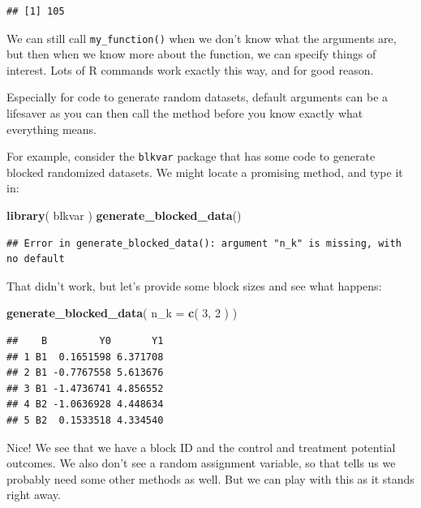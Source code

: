 \documentclass[
]{book}
\newenvironment{Shaded}{\begin{snugshade}}{\end{snugshade}}
\newcommand{\AttributeTok}[1]{\textcolor[rgb]{0.13,0.29,0.53}{#1}}
\newcommand{\DecValTok}[1]{\textcolor[rgb]{0.00,0.00,0.81}{#1}}
\newcommand{\FunctionTok}[1]{\textcolor[rgb]{0.13,0.29,0.53}{\textbf{#1}}}
\newcommand{\NormalTok}[1]{#1}
\begin{document}
\begin{verbatim}
## [1] 105
\end{verbatim}

We can still call \texttt{my\_function()} when we don't know what the arguments are, but then when we know more about the function, we can specify things of interest.
Lots of R commands work exactly this way, and for good reason.

Especially for code to generate random datasets, default arguments can be a lifesaver as you can then call the method before you know exactly what everything means.

For example, consider the \texttt{blkvar} package that has some code to generate blocked randomized datasets.
We might locate a promising method, and type it in:

\begin{Shaded}
\begin{Highlighting}[]
\FunctionTok{library}\NormalTok{( blkvar )}
\FunctionTok{generate\_blocked\_data}\NormalTok{()}
\end{Highlighting}
\end{Shaded}

\begin{verbatim}
## Error in generate_blocked_data(): argument "n_k" is missing, with no default
\end{verbatim}

That didn't work, but let's provide some block sizes and see what happens:

\begin{Shaded}
\begin{Highlighting}[]
\FunctionTok{generate\_blocked\_data}\NormalTok{( }\AttributeTok{n\_k =} \FunctionTok{c}\NormalTok{( }\DecValTok{3}\NormalTok{, }\DecValTok{2}\NormalTok{ ) )}
\end{Highlighting}
\end{Shaded}

\begin{verbatim}
##    B         Y0       Y1
## 1 B1  0.1651598 6.371708
## 2 B1 -0.7767558 5.613676
## 3 B1 -1.4736741 4.856552
## 4 B2 -1.0636928 4.448634
## 5 B2  0.1533518 4.334540
\end{verbatim}

Nice! We see that we have a block ID and the control and treatment potential outcomes. We also don't see a random assignment variable, so that tells us we probably need some other methods as well.
But we can play with this as it stands right away.
\end{document}
